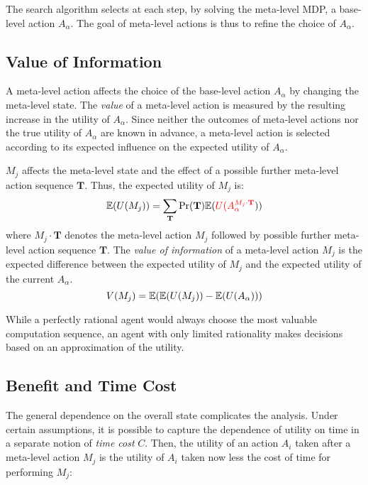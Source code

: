 The search algorithm selects at each step, by solving
the meta-level MDP, a  base-level action $A_\alpha$.
The goal of meta-level actions is thus to refine the choice of
$A_\alpha$.

\subsection{Value of Information}
\label{sec:ratimeta-voi}

A meta-level action affects the choice of the base-level action
$A_\alpha$ by changing the meta-level state.
The {\em value} of a meta-level action is measured by the
resulting increase in the utility of $A_\alpha$. Since neither the
outcomes of meta-level actions nor the true utility of $A_\alpha$ are
known in advance, a meta-level action is selected according to its
expected influence on the expected utility of $A_\alpha$.

$M_j$ affects the meta-level state and the effect of
a possible further meta-level action sequence $\mathbf{T}$. Thus, the expected utility of
$M_j$ is:
\begin{equation}
\label{eq:bg-limited-su}
\mathbb{E}(U(M_j))=\sum_{\mathbf{T}}\Pr(\mathbf{T})\mathbb{E}({\color{red} U(A_{\alpha}^{M_j\cdot\mathbf{T}}}))
\end{equation}
where $M_j\cdot\mathbf{T}$ denotes the meta-level action $M_j$
followed by possible further meta-level action sequence $\mathbf{T}$.
The {\em value of information} of a meta-level action $M_j$ is
the expected difference between the expected utility of $M_j$ and the
expected utility of the current $A_\alpha$.
\begin{equation}
\label{eq:bg-limited-nv}
V(M_j)=\mathbb{E}(\mathbb{E}(U(M_j))-\mathbb{E}(U(A_\alpha)))
\end{equation}

While a perfectly rational agent would always choose the most valuable
computation sequence, an agent with only limited rationality makes
decisions based on an approximation of the utility.

\subsection{Benefit and Time Cost}
\label{sec:ratimeta-benefit-timecost}

The general dependence on the overall state complicates the analysis. Under
certain assumptions, it is possible to capture the dependence of utility on time in a
separate notion of {\em time cost} $C$. Then, the utility of an action $A_i$ taken
 after a meta-level action $M_j$ is the utility of $A_i$ taken now less the
cost of time for performing $M_j$:


